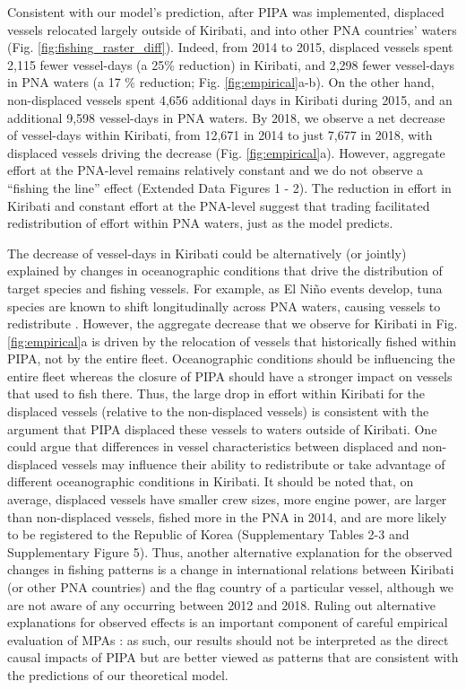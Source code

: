 \documentclass[12pt]{article}
\begin{document}
Consistent with our model's prediction, after PIPA was implemented, displaced vessels relocated largely outside of Kiribati, and into other PNA countries' waters (Fig. \ref{fig:fishing_raster_diff}). Indeed, from 2014 to 2015, displaced vessels spent 2,115 fewer vessel-days (a 25\% reduction) in Kiribati, and 2,298 fewer vessel-days in PNA waters (a 17 \% reduction; Fig. \ref{fig:empirical}a-b). On the other hand, non-displaced vessels spent 4,656 additional days in Kiribati during 2015, and an additional 9,598 vessel-days in PNA waters. By 2018, we observe a net decrease of vessel-days within Kiribati, from 12,671 in 2014 to just 7,677 in 2018, with displaced vessels driving the decrease (Fig. \ref{fig:empirical}a). However, aggregate effort at the PNA-level remains relatively constant and we do not observe a ``fishing the line'' effect (Extended Data Figures 1 - 2). The reduction in effort in Kiribati and constant effort at the PNA-level suggest that trading facilitated redistribution of effort within PNA waters, just as the model predicts.

The decrease of vessel-days in Kiribati could be alternatively (or jointly) explained by changes in oceanographic conditions that drive the distribution of target species and fishing vessels. For example, as El Ni\~no events develop, tuna species are known to shift longitudinally across PNA waters, causing vessels to redistribute \cite{aqorau_2018,hanich2018unraveling}. However, the aggregate decrease that we observe for Kiribati in Fig. \ref{fig:empirical}a is driven by the relocation of vessels that historically fished within PIPA, not by the entire fleet. Oceanographic conditions should be influencing the entire fleet whereas the closure of PIPA should have a stronger impact on vessels that used to fish there. Thus, the large drop in effort within Kiribati for the displaced vessels (relative to the non-displaced vessels) is consistent with the argument that PIPA displaced these vessels to waters outside of Kiribati. One could argue that differences in vessel characteristics between displaced and non-displaced vessels may influence their ability to redistribute or take advantage of different oceanographic conditions in Kiribati. It should be noted that, on average, displaced vessels have smaller crew sizes, more engine power, are larger than non-displaced vessels, fished more in the PNA in 2014, and are more likely to be registered to the Republic of Korea (Supplementary Tables 2-3 and Supplementary Figure 5). Thus, another alternative explanation for the observed changes in fishing patterns is a change in international relations between Kiribati (or other PNA countries) and the flag country of a particular vessel, although we are not aware of any occurring between 2012 and 2018. Ruling out alternative explanations for observed effects is an important component of careful empirical evaluation of MPAs \cite{ferraro2018causal}: as such, our results should not be interpreted as the direct causal impacts of PIPA but are better viewed as patterns that are consistent with the predictions of our theoretical model.
\end{document}
